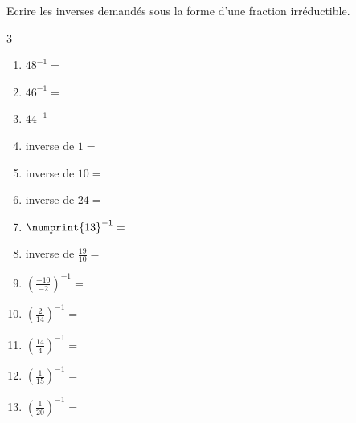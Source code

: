 \documentclass[main.tex]{subfiles}
\begin{document}
\begin{exercise}[\cancel{\faCalculator}] Ecrire les inverses demandés sous la forme d'une fraction irréductible.
	
	\begin{multicols}{3}
		\begin{enumerate}[label={\alph*)\rule{0pt}{1.8em}},leftmargin=*]
			\item $48^{-1}=$ 
			\item $46^{-1}=$
			\item $44^{-1}$
			\item inverse de $1=$
			\item inverse de $10=$
			\item inverse de $24=$
			\item $\numprint{13}^{-1}=$ 
			\item inverse de $\frac{19}{10}=$
			\item $\left(\frac{-10}{-2}\right)^{-1}=$ 
			\item $\left(\frac{2}{14}\right)^{-1}=$ 
			\item $\left(\frac{14}{4}\right)^{-1}=$ 
			\item $\left(\frac{1}{15}\right)^{-1}=$ 
			\item $\left(\frac{1}{20}\right)^{-1}=$ 
		\end{enumerate}
	\end{multicols}
\end{exercise}
\end{document}
